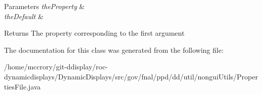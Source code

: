 \begin{DoxyParams}{Parameters}
{\em the\-Property} & \\
\hline
{\em the\-Default} & \\
\hline
\end{DoxyParams}
\begin{DoxyReturn}{Returns}
The property corresponding to the first argument 
\end{DoxyReturn}


The documentation for this class was generated from the following file\-:\begin{DoxyCompactItemize}
\item 
/home/mccrory/git-\/ddisplay/roc-\/dynamicdisplays/\-Dynamic\-Displays/src/gov/fnal/ppd/dd/util/nongui\-Utils/Properties\-File.\-java\end{DoxyCompactItemize}
